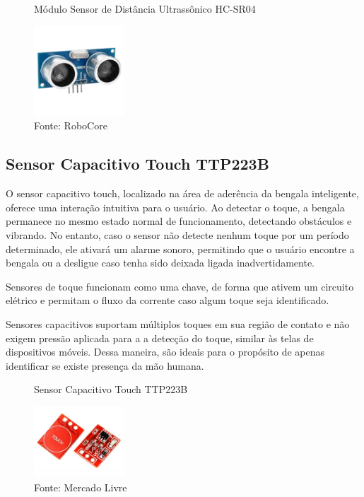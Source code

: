      \begin{figure}[ht]
        \captionsetup{width=1\textwidth}
        \caption{\label{fig:hcsr04} Módulo Sensor de Distância Ultrassônico HC-SR04}
        \centering
        \includegraphics[width=0.3\textwidth]{figuras/hcsr04} 
        \caption*{Fonte: RoboCore}
    \end{figure}


    \subsection{Sensor Capacitivo Touch TTP223B}

    O sensor capacitivo touch, localizado na área de aderência da bengala inteligente, oferece uma interação intuitiva para o usuário. Ao detectar o toque, a bengala permanece no mesmo estado normal de funcionamento, detectando obstáculos e vibrando. No entanto, caso o sensor não detecte nenhum toque por um período determinado, ele ativará um alarme sonoro, permitindo que o usuário encontre a bengala ou a desligue caso tenha sido deixada ligada inadvertidamente.

    Sensores de toque funcionam como uma chave, de forma que ativem um circuito elétrico e permitam o fluxo da corrente caso algum toque seja identificado. 
    
    Sensores capacitivos suportam múltiplos toques em sua região de contato e não exigem pressão aplicada para a a detecção do toque, similar às telas de dispositivos móveis. Dessa maneira, são ideais para o propósito de apenas identificar se existe presença da mão humana.

     \begin{figure}[h!]
        \captionsetup{width=1\textwidth}
        \caption{\label{fig:touch}Sensor Capacitivo Touch TTP223B}
        \centering
        \includegraphics[width=0.3\textwidth]{figuras/touch} 
        \caption*{Fonte: Mercado Livre}
    \end{figure}

